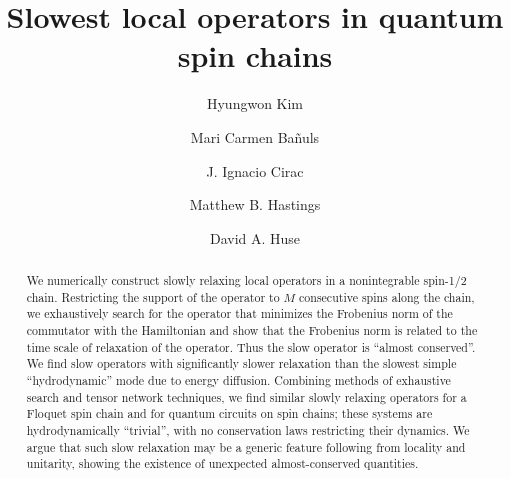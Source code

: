 \documentclass[twocolumn,superscriptaddress, prb]{revtex4-1}
\begin{document}
\title{Slowest local operators in quantum spin chains}

\author{Hyungwon Kim}

\author{Mari Carmen Ba\~{n}uls}

\author{J. Ignacio Cirac}

\author{Matthew B. Hastings}

\author{David A. Huse}

\begin{abstract}
We numerically construct slowly relaxing local operators in a nonintegrable spin-1/2 chain.
Restricting the support of the operator to $M$ consecutive spins along the chain,
we exhaustively search for the operator that minimizes the Frobenius norm of the commutator
with the Hamiltonian and show that the Frobenius norm is related to the time scale of relaxation of the operator.
Thus the slow operator is ``almost conserved''.
We find slow operators with significantly slower relaxation than
the slowest simple ``hydrodynamic'' mode due to energy diffusion.
Combining methods of exhaustive search and tensor network techniques, we find
similar slowly relaxing operators for a Floquet spin chain and for quantum circuits on spin chains;
these systems are hydrodynamically ``trivial'', with no conservation laws restricting their dynamics.
We argue that such slow relaxation may be a generic feature following from locality and unitarity,
showing the existence of unexpected almost-conserved quantities.
\end{abstract}

\pacs{}

\maketitle
\end{document}
